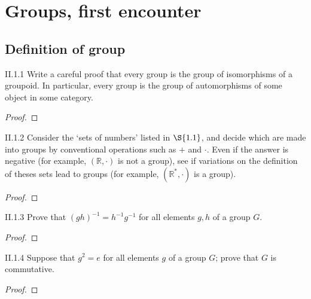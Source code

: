 \chapter{Groups, first encounter}

\section{Definition of group}

\begin{exercise}{II.1.1}
	Write a careful proof that every group is the group of isomorphisms of a groupoid. In particular, every group is the group of automorphisms of some object in some category.
\end{exercise}

\begin{proof}
\end{proof}

\begin{exercise}{II.1.2}
	Consider the `sets of numbers' listed in $\S{1.1}$, and decide which are made into groups by conventional operations such as $+$ and $\cdot$. Even if the answer is negative (for example, $(\mathbb{R}, \cdot)$ is not a group), see if variations on the definition of theses sets lead to groups (for example, $(\mathbb{R}^{*}, \cdot)$ is a group).
\end{exercise}

\begin{proof}
\end{proof}

\begin{exercise}{II.1.3}
	Prove that ${(gh)}^{-1} = h^{-1}g^{-1}$ for all elements $g, h$ of a group $G$.
\end{exercise}

\begin{proof}
\end{proof}

\begin{exercise}{II.1.4}
	Suppose that $g^{2} = e$ for all elements $g$ of a group $G$; prove that $G$ is commutative.
\end{exercise}

\begin{proof}
\end{proof}

